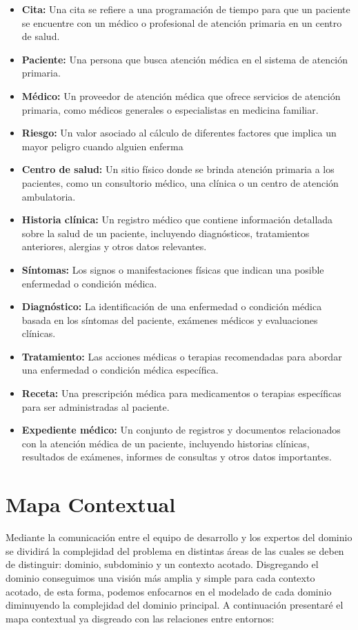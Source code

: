 \begin{itemize}
\item \textbf{Cita:} Una cita se refiere a una programación de tiempo para que un paciente se encuentre con un médico o profesional de atención primaria en un centro de salud.
\item \textbf{Paciente:} Una persona que busca atención médica en el sistema de atención primaria.
\item \textbf{Médico:} Un proveedor de atención médica que ofrece servicios de atención primaria, como médicos generales o especialistas en medicina familiar.
\item \textbf{Riesgo:} Un valor asociado al cálculo de diferentes factores que implica un mayor peligro cuando alguien enferma
\item \textbf{Centro de salud:} Un sitio físico donde se brinda atención primaria a los pacientes, como un consultorio médico, una clínica o un centro de atención ambulatoria.
\item \textbf{Historia clínica:} Un registro médico que contiene información detallada sobre la salud de un paciente, incluyendo diagnósticos, tratamientos anteriores, alergias y otros datos relevantes.
\item \textbf{Síntomas:} Los signos o manifestaciones físicas que indican una posible enfermedad o condición médica.
\item \textbf{Diagnóstico:} La identificación de una enfermedad o condición médica basada en los síntomas del paciente, exámenes médicos y evaluaciones clínicas.
\item \textbf{Tratamiento:} Las acciones médicas o terapias recomendadas para abordar una enfermedad o condición médica específica.
\item \textbf{Receta:} Una prescripción médica para medicamentos o terapias específicas para ser administradas al paciente.
\item \textbf{Expediente médico:} Un conjunto de registros y documentos relacionados con la atención médica de un paciente, incluyendo historias clínicas, resultados de exámenes, informes de consultas y otros datos importantes.
\end{itemize}

\section{Mapa Contextual}
Mediante la comunicación entre el equipo de desarrollo y los expertos del dominio se dividirá la complejidad del problema
en distintas áreas de las cuales se deben de distinguir: dominio, subdominio y un contexto acotado. Disgregando el dominio
conseguimos una visión más amplia y simple para cada contexto acotado, de esta forma, podemos enfocarnos en el modelado de
cada dominio diminuyendo la complejidad del dominio principal. A continuación presentaré el mapa contextual ya disgreado con
las relaciones entre entornos:

